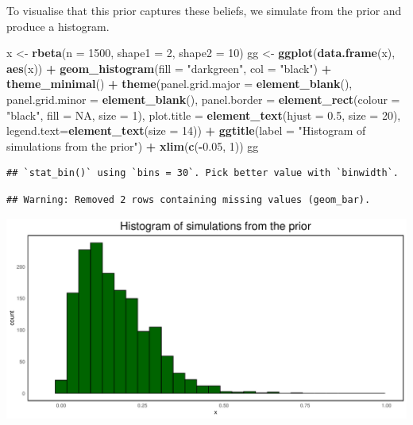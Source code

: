 \documentclass[
]{article}
\newenvironment{Shaded}{\begin{snugshade}}{\end{snugshade}}
\newcommand{\DataTypeTok}[1]{\textcolor[rgb]{0.13,0.29,0.53}{#1}}
\newcommand{\DecValTok}[1]{\textcolor[rgb]{0.00,0.00,0.81}{#1}}
\newcommand{\FloatTok}[1]{\textcolor[rgb]{0.00,0.00,0.81}{#1}}
\newcommand{\KeywordTok}[1]{\textcolor[rgb]{0.13,0.29,0.53}{\textbf{#1}}}
\newcommand{\NormalTok}[1]{#1}
\newcommand{\OperatorTok}[1]{\textcolor[rgb]{0.81,0.36,0.00}{\textbf{#1}}}
\newcommand{\OtherTok}[1]{\textcolor[rgb]{0.56,0.35,0.01}{#1}}
\newcommand{\StringTok}[1]{\textcolor[rgb]{0.31,0.60,0.02}{#1}}
\begin{document}
To visualise that this prior captures these beliefs, we simulate from
the prior and produce a histogram.

\begin{Shaded}
\begin{Highlighting}[]
\NormalTok{x <-}\StringTok{ }\KeywordTok{rbeta}\NormalTok{(}\DataTypeTok{n =} \DecValTok{1500}\NormalTok{, }\DataTypeTok{shape1 =} \DecValTok{2}\NormalTok{, }\DataTypeTok{shape2 =} \DecValTok{10}\NormalTok{)}
\NormalTok{gg <-}\StringTok{ }\KeywordTok{ggplot}\NormalTok{(}\KeywordTok{data.frame}\NormalTok{(x), }\KeywordTok{aes}\NormalTok{(x)) }\OperatorTok{+}\StringTok{ }\KeywordTok{geom_histogram}\NormalTok{(}\DataTypeTok{fill =} \StringTok{"darkgreen"}\NormalTok{, }\DataTypeTok{col =} \StringTok{"black"}\NormalTok{) }\OperatorTok{+}\StringTok{ }
\StringTok{      }\KeywordTok{theme_minimal}\NormalTok{() }\OperatorTok{+}\StringTok{ }
\StringTok{      }\KeywordTok{theme}\NormalTok{(}\DataTypeTok{panel.grid.major =} \KeywordTok{element_blank}\NormalTok{(), }\DataTypeTok{panel.grid.minor =} \KeywordTok{element_blank}\NormalTok{(),}
           \DataTypeTok{panel.border =} \KeywordTok{element_rect}\NormalTok{(}\DataTypeTok{colour =} \StringTok{"black"}\NormalTok{, }\DataTypeTok{fill =} \OtherTok{NA}\NormalTok{, }\DataTypeTok{size =} \DecValTok{1}\NormalTok{),}
           \DataTypeTok{plot.title =} \KeywordTok{element_text}\NormalTok{(}\DataTypeTok{hjust =} \FloatTok{0.5}\NormalTok{, }\DataTypeTok{size =} \DecValTok{20}\NormalTok{),}
           \DataTypeTok{legend.text=}\KeywordTok{element_text}\NormalTok{(}\DataTypeTok{size =} \DecValTok{14}\NormalTok{)) }\OperatorTok{+}\StringTok{ }
\StringTok{      }\KeywordTok{ggtitle}\NormalTok{(}\DataTypeTok{label =} \StringTok{"Histogram of simulations from the prior"}\NormalTok{) }\OperatorTok{+}\StringTok{ }\KeywordTok{xlim}\NormalTok{(}\KeywordTok{c}\NormalTok{(}\OperatorTok{-}\FloatTok{0.05}\NormalTok{, }\DecValTok{1}\NormalTok{))}
\NormalTok{gg}
\end{Highlighting}
\end{Shaded}

\begin{verbatim}
## `stat_bin()` using `bins = 30`. Pick better value with `binwidth`.
\end{verbatim}

\begin{verbatim}
## Warning: Removed 2 rows containing missing values (geom_bar).
\end{verbatim}

\includegraphics[width=0.7\linewidth]{F1000TAGMworkflow_rev1_files/figure-latex/unnamed-chunk-22-1}
\end{document}
